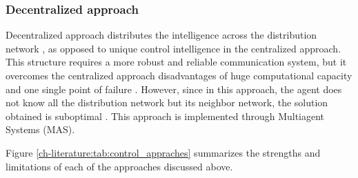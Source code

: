 \subsubsection*{Decentralized approach}
Decentralized approach distributes the intelligence across the distribution network \cite{Shen2018}, as opposed 
to unique control intelligence in the centralized approach. This structure requires a more robust 
and reliable communication system, but it overcomes the centralized approach disadvantages of huge 
computational capacity and one single point of failure \cite{Zidan2017} \cite{Abu-Elanien2018}. However, since in this approach, the 
agent does not know all the distribution network but its neighbor network, the solution 
obtained is suboptimal \cite{Koch-Ciobotaru2014}. 
This approach is implemented through Multiagent Systems (MAS). 


Figure \ref{ch-literature:tab:control_appraches} summarizes the strengths and limitations of each of the approaches discussed above.












